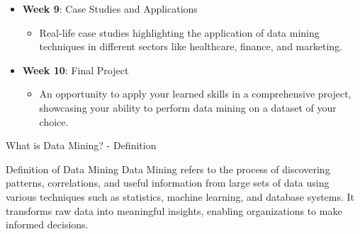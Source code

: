 \documentclass[aspectratio=169]{beamer}
\begin{document}
\begin{frame}[fragile]
\begin{itemize}
        \item \textbf{Week 9}: Case Studies and Applications
        \begin{itemize}
            \item Real-life case studies highlighting the application of data mining techniques in different sectors like healthcare, finance, and marketing.
        \end{itemize}
        
        \item \textbf{Week 10}: Final Project
        \begin{itemize}
            \item An opportunity to apply your learned skills in a comprehensive project, showcasing your ability to perform data mining on a dataset of your choice.
        \end{itemize}
    \end{itemize}
\end{frame}

\begin{frame}[fragile]{What is Data Mining? - Definition}
    \begin{block}{Definition of Data Mining}
        Data Mining refers to the process of discovering patterns, correlations, and useful information from large sets of data using various techniques such as statistics, machine learning, and database systems. It transforms raw data into meaningful insights, enabling organizations to make informed decisions.
    \end{block}
\end{frame}
\end{document}
